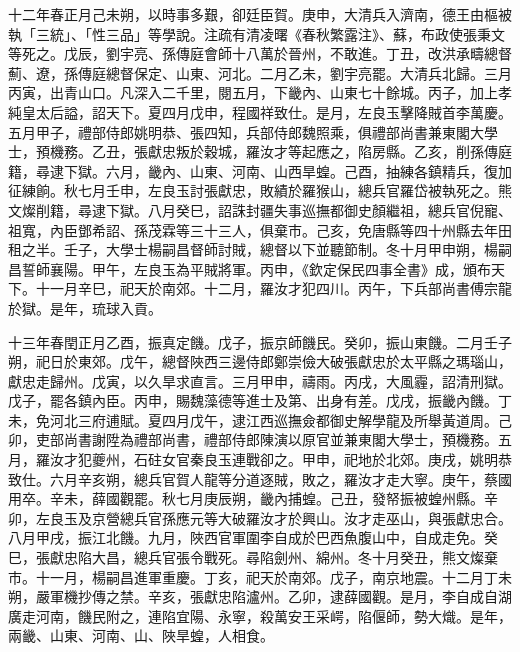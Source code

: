 \begin{pinyinscope}
十二年春正月己未朔，以時事多艱，卻廷臣賀。庚申，大清兵入濟南，德王由樞被執「三統」、「性三品」等學說。注疏有清凌曙《春秋繁露注》、蘇，布政使張秉文等死之。戊辰，劉宇亮、孫傳庭會師十八萬於晉州，不敢進。丁丑，改洪承疇總督薊、遼，孫傳庭總督保定、山東、河北。二月乙未，劉宇亮罷。大清兵北歸。三月丙寅，出青山口。凡深入二千里，閱五月，下畿內、山東七十餘城。丙子，加上孝純皇太后謚，詔天下。夏四月戊申，程國祥致仕。是月，左良玉擊降賊首李萬慶。五月甲子，禮部侍郎姚明恭、張四知，兵部侍郎魏照乘，俱禮部尚書兼東閣大學士，預機務。乙丑，張獻忠叛於穀城，羅汝才等起應之，陷房縣。乙亥，削孫傳庭籍，尋逮下獄。六月，畿內、山東、河南、山西旱蝗。己酉，抽練各鎮精兵，復加征練餉。秋七月壬申，左良玉討張獻忠，敗績於羅猴山，總兵官羅岱被執死之。熊文燦削籍，尋逮下獄。八月癸巳，詔誅封疆失事巡撫都御史顏繼祖，總兵官倪寵、祖寬，內臣鄧希詔、孫茂霖等三十三人，俱棄市。己亥，免唐縣等四十州縣去年田租之半。壬子，大學士楊嗣昌督師討賊，總督以下並聽節制。冬十月甲申朔，楊嗣昌誓師襄陽。甲午，左良玉為平賊將軍。丙申，《欽定保民四事全書》成，頒布天下。十一月辛巳，祀天於南郊。十二月，羅汝才犯四川。丙午，下兵部尚書傅宗龍於獄。是年，琉球入貢。

十三年春閏正月乙酉，振真定饑。戊子，振京師饑民。癸卯，振山東饑。二月壬子朔，祀日於東郊。戊午，總督陜西三邊侍郎鄭崇儉大破張獻忠於太平縣之瑪瑙山，獻忠走歸州。戊寅，以久旱求直言。三月甲申，禱雨。丙戌，大風霾，詔清刑獄。戊子，罷各鎮內臣。丙申，賜魏藻德等進士及第、出身有差。戊戌，振畿內饑。丁未，免河北三府逋賦。夏四月戊午，逮江西巡撫僉都御史解學龍及所舉黃道周。己卯，吏部尚書謝陞為禮部尚書，禮部侍郎陳演以原官並兼東閣大學士，預機務。五月，羅汝才犯夔州，石砫女官秦良玉連戰卻之。甲申，祀地於北郊。庚戌，姚明恭致仕。六月辛亥朔，總兵官賀人龍等分道逐賊，敗之，羅汝才走大寧。庚午，蔡國用卒。辛未，薛國觀罷。秋七月庚辰朔，畿內捕蝗。己丑，發帑振被蝗州縣。辛卯，左良玉及京營總兵官孫應元等大破羅汝才於興山。汝才走巫山，與張獻忠合。八月甲戌，振江北饑。九月，陜西官軍圍李自成於巴西魚腹山中，自成走免。癸巳，張獻忠陷大昌，總兵官張令戰死。尋陷劍州、綿州。冬十月癸丑，熊文燦棄市。十一月，楊嗣昌進軍重慶。丁亥，祀天於南郊。戊子，南京地震。十二月丁未朔，嚴軍機抄傳之禁。辛亥，張獻忠陷瀘州。乙卯，逮薛國觀。是月，李自成自湖廣走河南，饑民附之，連陷宜陽、永寧，殺萬安王采崿，陷偃師，勢大熾。是年，兩畿、山東、河南、山、陜旱蝗，人相食。


\end{pinyinscope}
